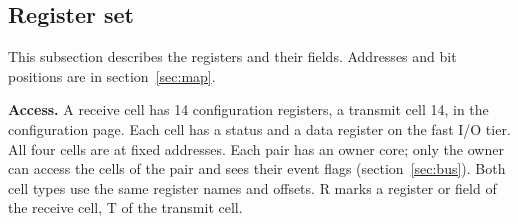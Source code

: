 \documentclass[10pt,a4paper]{article}
\begin{document}
\subsection{Register set}\label{sec:lcreg}

This subsection describes the registers and their fields. Addresses and bit positions are in
section~\ref{sec:map}.

\textbf{Access.} A receive cell has 14 configuration registers, a transmit cell 14, in the configuration page.
Each cell has a status and a data register on the fast I/O tier. All four cells are at fixed addresses. Each
pair has an owner core; only the owner can access the cells of the pair and sees their event flags
(section~\ref{sec:bus}). Both cell types use the same register names and offsets. R marks a register or field
of the receive cell, T of the transmit cell.
\end{document}
